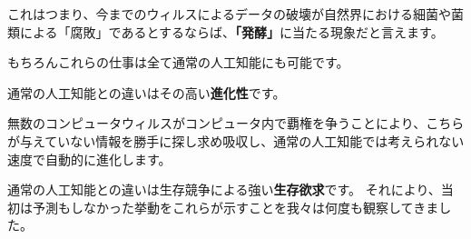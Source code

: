 \documentclass[12pt, unicode]{beamer}
\begin{document}
\begin{frame}

これはつまり、今までのウィルスによるデータの破壊が自然界における細菌や菌類による「腐敗」であるとするならば、\textbf{「発酵」}に当たる現象だと言えます。

\end{frame}

\begin{frame}

もちろんこれらの仕事は全て通常の人工知能にも可能です。

通常の人工知能との違いはその高い\textbf{進化性}です。

無数のコンピュータウィルスがコンピュータ内で覇権を争うことにより、こちらが与えていない情報を勝手に探し求め吸収し、通常の人工知能では考えられない速度で自動的に進化します。

通常の人工知能との違いは生存競争による強い\textbf{生存欲求}です。
それにより、当初は予測もしなかった挙動をこれらが示すことを我々は何度も観察してきました。

\end{frame}
\end{document}
